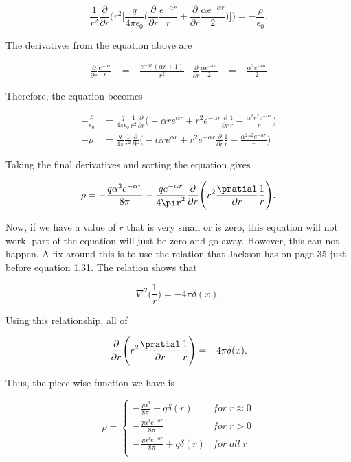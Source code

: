 \documentclass[11pt]{article}
\begin{document}
$$
\frac{1}{r^{2}}\frac{\partial}{\partial r}  \Bigg(r^{2} \Bigg[ \frac{q}{4\pi \epsilon_{0}} \Bigg(\frac{\partial}{\partial r} \frac{e^{-\alpha r}}{r} + \frac{\partial}{\partial r} \frac{\alpha e^{-\alpha r} }{2}\Bigg) \Bigg]\Bigg) = -\frac{\rho}{\epsilon_{0}}.
$$

The derivatives from the equation above are

\begin{align*}
    \frac{\partial}{\partial r} \frac{e^{-\alpha r}}{r} &= -\frac{e^{-\alpha r}(\alpha r + 1)}{r^{2}} & 
    \frac{\partial}{\partial r} \frac{\alpha e^{-\alpha r} }{2} &= -\frac{\alpha^{2} e^{-\alpha r}}{2}
\end{align*}

Therefore, the equation becomes

\begin{align*}
    -\frac{\rho}{\epsilon_{0}} &= \frac{q}{4\pi\epsilon_{0}}\frac{1}{r^{2}}\frac{\partial}{\partial r}\Bigg(-\alpha r e^{\alpha r} + r^{2}e^{-\alpha r} 
    \frac{\partial}{\partial r} \frac{1}{r} - \frac{\alpha^{2}r^{2}e^{-\alpha r}}{r} \Bigg) \\
    -\rho &= \frac{q}{4\pi}\frac{1}{r^{2}}\frac{\partial}{\partial r}\Bigg(-\alpha r e^{\alpha r} + r^{2}e^{-\alpha r} 
    \frac{\partial}{\partial r} \frac{1}{r} - \frac{\alpha^{2}r^{2}e^{-\alpha r}}{r} \Bigg)
\end{align*}

Taking the final derivatives and sorting the equation gives

$$
\rho = -\frac{q\alpha^{3}e^{-\alpha r} }{8\pi}- \frac{q e^{-\alpha r} }{4\pir^{2}} \frac{\partial}{\partial r} \Bigg(r^{2} \frac{\pratial}{\partial r} \frac{1}{r}\Bigg).
$$

Now, if we have a value of $r$ that is very small or is zero, this equation will not work. part of the equation will just be zero and go away. However, this can not happen. A fix around this is to use the relation that Jackson has on page 35 just before equation 1.31. The relation shows that 

$$
\nabla^{2}\Bigg(\frac{1}{r}\Bigg) = -4\pi\delta(x).
$$

Using this relationship, all of 

$$
\frac{\partial}{\partial r} \Bigg(r^{2} \frac{\pratial}{\partial r} \frac{1}{r}\Bigg) = -4\pi\delta(x).
$$

Thus, the piece-wise function we have is 

\[ \rho = \begin{cases} 
      -\frac{q\alpha^{3} }{8\pi} + q\delta(r)  & for \; r \approx 0 \\
      -\frac{q\alpha^{3}e^{-\alpha r}}{8\pi} & for \; r > 0 \\
      -\frac{q\alpha^{3}e^{-\alpha r}}{8\pi} + q\delta(r) & for \; all \; r \\
   \end{cases}
\]
\end{document}
